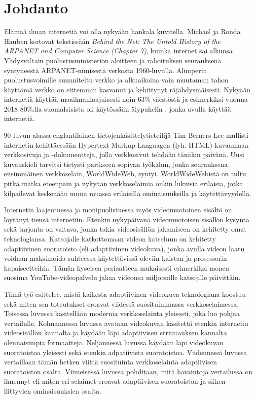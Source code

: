 \documentclass[finnish, 12pt, a4paper, elec, utf8, a-1b, online]{aaltothesis}
\begin{document}
\cleardoublepage


\section{Johdanto}
  Elämää ilman internetiä voi olla nykyään hankala kuvitella. Michael ja Ronda Hauben kertovat tekstissään \textit{Behind the Net: The Untold History of the ARPANET and Computer Science (Chapter 7)}, kuinka internet sai alkunsa Yhdysvaltain puolustusministeriön aloitteen ja rahoituksen seurauksena syntyneestä ARPANET-nimisestä verkosta 1960-luvulla. \cite{Hauben} Alunperin puolustusvoimille suunniteltu verkko ja alkuaikoina vain muutaman tahon käyttämä verkko on sittemmin kasvanut ja kehittynyt räjähdysmäisesti. Nykyään internetiä käyttää maailmanlaajuisesti noin 63\% väestöstä \cite{ITU} ja esimerkiksi vuonna 2018 80\%:lla suomalaisista oli käytössään älypuhelin \cite{SVT}, jonka avulla käyttää internetiä.

  90-luvun alussa englantilainen tietojenkäsittelytieteilijä Tim Berners-Lee mullisti internetin kehittäessään Hypertext Markup Languagen (lyh. HTML) kuvaamaan verkkosivuja ja -dokumentteja, jolla verkkosivut tehdään tänäkin päivänä. Uusi kuvauskieli tarvitsi tietysti parikseen sopivan työkalun, jonka seurauksena ensimmäinen verkkoselain, WorldWideWeb, syntyi. WorldWideWebistä on tultu pitkä matka eteenpäin ja nykyään verkkoselaimia onkin lukuisia erilaisia, jotka kilpailevat keskenään muun muassa erilaisilla ominaisuuksilla ja käytettävyydellä.

  Internetin laajentuessa ja monipuolistuessa myös videomuotoinen sisältö on löytänyt tiensä internetiin. Etenkin nykypäivänä videomuotoisen sisällön kysyntä sekä tarjonta on valtava, jonka takia videosisällön jakamiseen on kehitetty omat teknologiansa. Katsojalle katkottomaan videon katseluun on kehitetty adaptiivinen suoratoisto (eli adaptiivinen videokuva), jonka avulla videon laatu voidaan maksimoida suhteessa käytettävissä oleviin kaistan ja prosessorin kapaiseetteihin. Tämän kyseisen periaatteen mukaisesti erimerkiksi monen suosima YouTube-videopalvelu jakaa videonsa miljoonille katsojille päivittäin.

  Tämä työ esittelee, mistä kaikesta adaptiivinen videokuva teknologiana koostuu sekä miten sen toteutukset eroavat viidessä suosituimmassa verkkoselaimessa. Toisessa luvussa käsitellään modernia verkkoselainta yleisesti, joka luo pohjaa vertailulle. Kolmannessa luvussa avataan videokuvan käsitettä etenkin internetin videosisällön kannalta ja käydään läpi adaptiivisen striimauksen kannalta olennaisimpia formaatteja. Neljännessä luvussa käydään läpi videokuvan suoratoistoa yleisesti sekä etenkin adpatiivista suoratoistoa. Viidennessä luvussa vertaillaan tämän hetken viittä suosituinta verkkoselainta adaptiivisen suoratoiston osalta. Viimeisessä luvussa pohditaan, mitä havaintoja vertailussa on ilmennyt eli miten eri selaimet eroavat adaptiivisen suoratoiston ja siihen liittyvien ominaisuuksien osalta.
\end{document}
